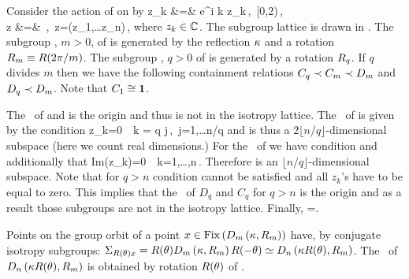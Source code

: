 \begin{example} %
 Consider the action of  on  by
 \bea
	\Rot{\theta} z_k &=& e^{i k \theta} z_k\,,\ \theta\in[0,2\pi)\,,\label{eq:SO2stndrd} \\
	\Refl z &=& \,,\  z=(z_1,\ldots z_n)\,,
	\label{eq:O2stndrd}
 \eea
where $z_k\in\mathbb{C}^{}$. The subgroup lattice is drawn in . The subgroup
, $m>0$, of  is generated by the reflection $\kappa$ and a rotation $R_{m}\equiv R(2\pi/m)$.
The subgroup , $q>0$ of  is generated by a rotation $R_{q}$.
If $q$ divides $m$ then we have the following containment relations $C_{q}\prec C_{m}\prec D_{m}$
and $D_{q}\prec D_{m}$. Note that $C_{1}\cong\mathbf{1}$.

The \fixedsp\ of  and  is the origin and thus  is not in the isotropy lattice.
The \fixedsp\ of  is given by the condition
\beq
	z_k=0\ \ k = q j\,,\ j=1,\ldots\lfloor n/q \rfloor
	\label{eq:O2CqFix}
\eeq
and is thus a $2 \lfloor n/q\rfloor$-dimensional subspace (here we count real dimensions.)
For the \fixedsp\ of  we have condition  and additionally that
\beq
	Im(z_k)=0\ \ k=1,\ldots,n\,.
\eeq
Therefore  is an $ \lfloor n/q\rfloor$-dimensional subspace. Note that for $q>n$ condition
 cannot be satisfied and all $z_k$'s have to be equal to zero. This implies that the \fixedsp\ of $D_q$ and $C_q$ for $q>n$ is the origin and as a result those subgroups are not in the isotropy lattice. Finally, \Fix{\Idg}=.

Points on the group orbit of a point  $x\in\mathrm{Fix}\left(D_{m}\left(\kappa,R_{m}\right)\right)$ have, by  conjugate
isotropy subgroups: $\Sigma_{R(\theta)x}=R(\theta)D_{m}\left(\kappa,R_{m}\right)R(-\theta)\simeq D_{n}\left(\kappa R(\theta),R_{m}\right)$. The \fixedsp\ of $D_{n}\left(\kappa R(\theta),R_{m}\right)$ is obtained by rotation $R(\theta)$ of .





\end{example}
